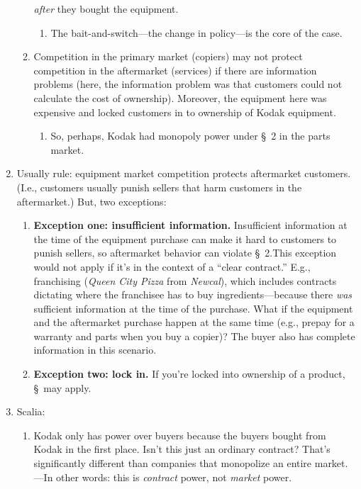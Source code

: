 \begin{enumerate}
\begin{enumerate}
{        \emph{after} they bought the equipment.}
        \begin{enumerate}
            \item The bait-and-switch---the change in policy---is the core 
            of the case.
        \end{enumerate}
        \item Competition in the primary market (copiers) may not protect 
        competition in the aftermarket (services) if there are information 
        problems (here, the information problem was that customers could not 
        calculate the cost of ownership). Moreover, the equipment here was 
        expensive and locked customers in to ownership of Kodak equipment.
        \begin{enumerate}
            \item So, perhaps, Kodak had monopoly power under \S\ 2 in 
            the parts market.
        \end{enumerate}
    \end{enumerate}
    \item Usually rule: equipment market competition protects aftermarket 
    customers. (I.e., customers usually punish sellers that harm customers in 
    the aftermarket.) But, two exceptions: 
    \begin{enumerate}
        \item \textbf{Exception one: insufficient information.} Insufficient information at the time of the equipment 
        purchase can make it hard to customers to punish sellers, so 
        aftermarket behavior can violate \S\ 2.This exception would not apply 
        if it's in the context of a ``clear contract.'' E.g., franchising 
        (\emph{Queen City Pizza} from \emph{Newcal}), which includes contracts 
        dictating where the franchisee has to buy ingredients---because there 
        \emph{was} sufficient information at the time of the purchase. What if 
        the equipment and the aftermarket purchase happen at the same time 
        (e.g., prepay for a warranty and parts when you buy a copier)? The 
        buyer also has complete information in this scenario.
        \item \textbf{Exception two: lock in.} If you're locked into ownership 
        of a product, \S\ may apply.
    \end{enumerate}
    \item Scalia:
    \begin{enumerate}
        \item Kodak only has power over buyers because the buyers bought from 
        Kodak in the first place. Isn't this just an ordinary contract? That's 
        significantly different than companies that monopolize an entire 
        market.---In other words: this is \emph{contract} power, not 
        \emph{market} power.
    \end{enumerate}
\end{enumerate}

